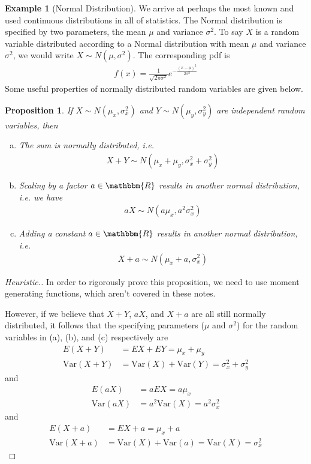 \documentclass[11pt,letterpaper]{article}
\newcommand\real{\mathbbm{R}}
\newcommand\var{\text{Var}}
\numberwithin{theorem}{section}
\numberwithin{definition}{section}
\numberwithin{lemma}{section}
\numberwithin{corollary}{section}
\newtheorem{proposition}[theorem]{Proposition}
\numberwithin{proposition}{section}
\theoremstyle{definition}
\numberwithin{remark}{section}
\numberwithin{claim}{section}
\numberwithin{observation}{section}
\numberwithin{fact}{section}
\numberwithin{assumption}{section}
\newtheorem{example}[theorem]{Example}
\numberwithin{example}{section}
\numberwithin{exercise}{section}
\begin{document}
\begin{example}[Normal Distribution]
We arrive at perhaps the most known and used continuous distributions in all of statistics. The Normal distribution is specified by two parameters, the mean $\mu$ and variance $\sigma^2$. To say $X$ is a random variable distributed according to a Normal distribution with mean $\mu$ and variance $\sigma^2$, we would write $X \sim N(\mu,\sigma^2)$. The corresponding pdf is
\begin{align*}
f(x) = \frac{1}{\sqrt{2\pi \sigma^2}} e^{-\frac{(x-\mu)^2}{2\sigma^2}}
\end{align*}
Some useful properties of normally distributed random variables are given below.
\begin{proposition}
If $X\sim N(\mu_x,\sigma^2_x)$ and $Y \sim N(\mu_{y},\sigma^2_{y})$ are independent random variables, then 
\begin{enumerate}[(a)]
\item The sum is normally distributed, i.e.
\begin{align*}
X + Y \sim N(\mu_x + \mu_y, \sigma^2_x + \sigma^2_y)
\end{align*}

\item Scaling by a factor $a \in \real$ results in another normal distribution, i.e. we have 
\begin{align*}
aX \sim N(a\mu_x, a^2\sigma^2_x)
\end{align*}

\item Adding a constant $a \in \real$ results in another normal distribution, i.e.
\begin{align*}
X + a \sim N(\mu_x + a, \sigma_x^2)
\end{align*}
\end{enumerate}
\end{proposition}

\begin{proof}[Heuristic.]
In order to rigorously prove this proposition, we need to use moment generating functions, which aren't covered in these notes. 

However, if we believe that $X + Y$, $aX$, and $X+a$ are all still normally distributed, it follows that the specifying parameters ($\mu$ and $\sigma^2$) for the random variables in (a), (b), and (c) respectively are
\begin{align*}
E(X+Y) &= EX + EY = \mu_x + \mu_y \\
\var(X+Y) &= \var(X) + \var(Y) = \sigma_x^2 + \sigma_y^2
\end{align*}
and
\begin{align*}
E(aX) &= aEX = a\mu_x \\
\var(aX) &= a^2\var(X) = a^2 \sigma_x^2
\end{align*}
and
\begin{align*}
E(X + a) &= EX + a = \mu_x + a \\
\var(X + a) &= \var(X) + \var(a) = \var(X) = \sigma_x^2
\end{align*}
\end{proof}
\end{example}
\end{document}
